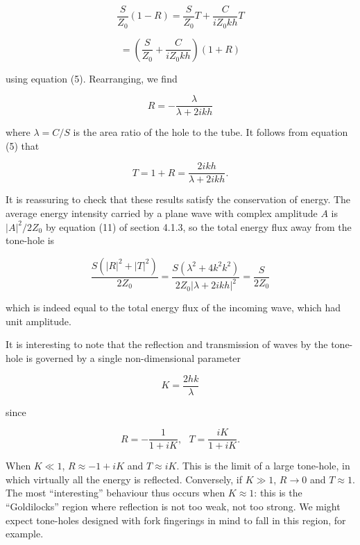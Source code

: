   $$\dfrac{S}{Z_0}(1-R)=\dfrac{S}{Z_0}T +\dfrac{C}{iZ_0 kh}T \tag{8}$$ 

  $$=\left(\dfrac{S}{Z_0}+\dfrac{C}{iZ_0 kh} \right) (1+R) \tag{9}$$ 

  using equation (5). Rearranging, we find 

  $$R=-\dfrac{\lambda}{\lambda+2ikh} \tag{10}$$ 

  where $\lambda=C/S$ is the area ratio of the hole to the tube. It follows 
  from equation (5) that 

  $$T=1+R = \dfrac{2ikh}{\lambda+2ikh} . \tag{11}$$ 

  It is reassuring to check that these results satisfy the conservation of 
  energy. The average energy intensity carried by a plane wave with complex 
  amplitude $A$ is $|A|^2/2Z_0$ by equation (11) of section 4.1.3, so the total 
  energy flux away from the tone-hole is 

  $$\dfrac{S(|R|^2 + |T|^2)}{2Z_0} = \dfrac{S(\lambda^2+ 
  4k^2k^2)}{2Z_0|\lambda+2ikh|^2} = \dfrac{S}{2Z_0} \tag{12}$$ 

  which is indeed equal to the total energy flux of the incoming wave, which 
  had unit amplitude. 

  It is interesting to note that the reflection and transmission of waves by 
  the tone-hole is governed by a single non-dimensional parameter 

  $$K=\dfrac{2hk}{\lambda} \tag{13}$$ 

  since 

  $$R=-\dfrac{1}{1+iK}, \mathrm{~~~}T=\dfrac{iK}{1+iK} . \tag{14}$$ 

  When $K \ll 1$, $R \approx -1+iK$ and $T \approx iK$. This is the limit of a 
  large tone-hole, in which virtually all the energy is reflected. Conversely, 
  if $K \gg 1$, $R \rightarrow 0$ and $T \approx 1$. The most ``interesting'' 
  behaviour thus occurs when $K \approx 1$: this is the ``Goldilocks'' region 
  where reflection is not too weak, not too strong. We might expect tone-holes 
  designed with fork fingerings in mind to fall in this region, for example. 